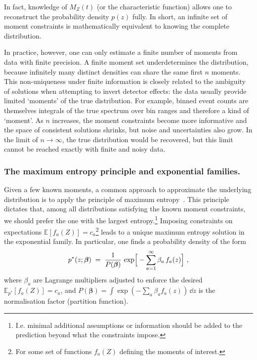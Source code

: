 {{        
        In fact, knowledge of $M_Z(t)$ (or the characteristic function) allows one to reconstruct the probability density $p(z)$ fully.
        In short, an infinite set of moment constraints is mathematically equivalent to knowing the complete distribution.

        In practice, however, one can only estimate a finite number of moments from data with finite precision.
        A finite moment set underdetermines the distribution, because infinitely many distinct densities can share the same first $n$ moments.
        This non-uniqueness under finite information is closely related to the ambiguity of solutions when attempting to invert detector effects: the data usually provide limited `moments' of the true distribution.
        For example, binned event counts are themselves integrals of the true spectrum over bin ranges and therefore a kind of `moment'.
        As $n$ increases, the moment constraints become more informative and the space of consistent solutions shrinks, but noise and uncertainties also grow.
        In the limit of $n\to\infty$, the true distribution would be recovered, but this limit cannot be reached exactly with finite and noisy data.

        \subsubsection{The maximum entropy principle and exponential families.}
            Given a few known moments, a common approach to approximate the underlying distribution is to apply the principle of maximum entropy~\cite{Matzke:275528}.
            This principle dictates that, among all distributions satisfying the known moment constraints, we should prefer the one with the largest entropy.\footnote{I.e. minimal additional assumptions or information should be added to the prediction beyond what the constraints impose.}
            Imposing constraints on expectations $\mathbb{E}[f_a(Z)] = c_a$\footnote{For some set of functions $f_a(Z)$ defining the moments of interest.} leads to a unique maximum entropy solution in the exponential family.
            In particular, one finds a probability density of the form
            \[
                \label{eq:infinite-generator}
                p^*(z; \vb*\beta) \;=\; \frac{1}{P(\boldsymbol{\beta})}\,\exp\!\Big[-\sum_{a=1}^\infty\beta_a\,f_a(z)\Big]~,
            \]
            where $\beta_a$ are Lagrange multipliers adjusted to enforce the desired $\mathbb{E}_{p^*}[f_a(Z)] = c_a$, and $P(\boldsymbol{\beta}) = \int \exp(-\sum_a \beta_a f_a(z))\,\dd z$ is the normalisation factor (partition function).
            
}}
